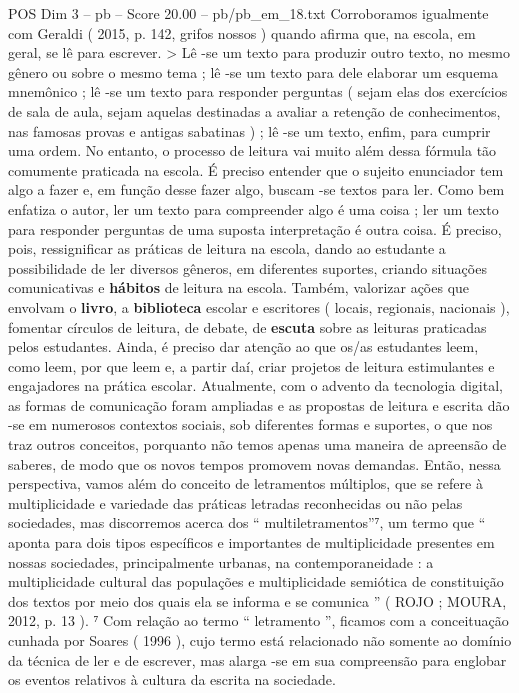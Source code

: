 \begin{textsample}{POS Dim 3 – pb – Score 20.00 – pb/pb\_em\_18.txt}
Corroboramos igualmente com Geraldi ( 2015, p. 142, grifos nossos ) quando afirma que, na escola, em geral, se lê para escrever. > Lê -se um texto para produzir outro texto, no mesmo gênero ou sobre o mesmo tema ; lê -se um texto para dele elaborar um esquema mnemônico ; lê -se um texto para responder perguntas ( sejam elas dos exercícios de sala de aula, sejam aquelas destinadas a avaliar a retenção de conhecimentos, nas famosas provas e antigas sabatinas ) ; lê -se um texto, enfim, para cumprir uma ordem.
No entanto, o processo de leitura vai muito além dessa fórmula tão comumente praticada na escola.
É preciso entender que o sujeito enunciador tem algo a fazer e, em função desse fazer algo, buscam -se textos para ler.
Como bem enfatiza o autor, ler um texto para compreender algo é uma coisa ; ler um texto para responder perguntas de uma suposta interpretação é outra coisa.
É preciso, pois, ressignificar as práticas de leitura na escola, dando ao estudante a possibilidade de ler diversos gêneros, em diferentes suportes, criando situações comunicativas e \textbf{hábitos} de leitura na escola.
Também, valorizar ações que envolvam o \textbf{livro}, a \textbf{biblioteca} escolar e escritores ( locais, regionais, nacionais ), fomentar círculos de leitura, de debate, de \textbf{escuta} sobre as leituras praticadas pelos estudantes.
Ainda, é preciso dar atenção ao que os/as estudantes leem, como leem, por que leem e, a partir daí, criar projetos de leitura estimulantes e engajadores na prática escolar.
Atualmente, com o advento da tecnologia digital, as formas de comunicação foram ampliadas e as propostas de leitura e escrita dão -se em numerosos contextos sociais, sob diferentes formas e suportes, o que nos traz outros conceitos, porquanto não temos apenas uma maneira de apreensão de saberes, de modo que os novos tempos promovem novas demandas.
Então, nessa perspectiva, vamos além do conceito de letramentos múltiplos, que se refere à multiplicidade e variedade das práticas letradas reconhecidas ou não pelas sociedades, mas discorremos acerca dos “ multiletramentos”⁷, um termo que “ aponta para dois tipos específicos e importantes de multiplicidade presentes em nossas sociedades, principalmente urbanas, na contemporaneidade : a multiplicidade cultural das populações e multiplicidade semiótica de constituição dos textos por meio dos quais ela se informa e se comunica ” ( ROJO ; MOURA, 2012, p. 13 ). ⁷ Com relação ao termo “ letramento ”, ficamos com a conceituação cunhada por Soares ( 1996 ), cujo termo está relacionado não somente ao domínio da técnica de ler e de escrever, mas alarga -se em sua compreensão para englobar os eventos relativos à cultura da escrita na sociedade.

\end{textsample}
